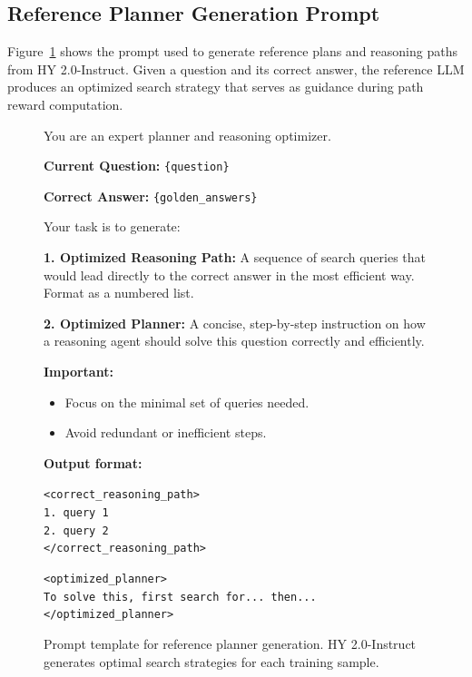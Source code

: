 \documentclass[11pt]{article}
\begin{document}
\subsection{Reference Planner Generation Prompt}

Figure~\ref{fig:prompt_planner} shows the prompt used to generate reference plans and reasoning paths from HY 2.0-Instruct. Given a question and its correct answer, the reference LLM produces an optimized search strategy that serves as guidance during path reward computation.

\begin{figure}[t]
\centering
\begin{tcolorbox}[colback=blue!3, colframe=blue!40, title=\textbf{Reference Planner Generation Prompt}, fonttitle=\bfseries, boxrule=0.5pt, left=3mm, right=3mm, top=2mm, bottom=2mm]
You are an expert planner and reasoning optimizer.

\textbf{Current Question:} \texttt{\{question\}}

\textbf{Correct Answer:} \texttt{\{golden\_answers\}}

Your task is to generate:

\textbf{1. Optimized Reasoning Path:} A sequence of search queries that would lead directly to the correct answer in the most efficient way. Format as a numbered list.

\textbf{2. Optimized Planner:} A concise, step-by-step instruction on how a reasoning agent should solve this question correctly and efficiently.

\textbf{Important:}
\begin{itemize}[leftmargin=*, nosep]
\item Focus on the minimal set of queries needed.
\item Avoid redundant or inefficient steps.
\end{itemize}

\textbf{Output format:}

\texttt{<correct\_reasoning\_path>}\\
\texttt{1. query 1}\\
\texttt{2. query 2}\\
\texttt{</correct\_reasoning\_path>}

\texttt{<optimized\_planner>}\\
\texttt{To solve this, first search for... then...}\\
\texttt{</optimized\_planner>}
\end{tcolorbox}
\caption{Prompt template for reference planner generation. HY 2.0-Instruct generates optimal search strategies for each training sample.}
\label{fig:prompt_planner}
\end{figure}
\end{document}
